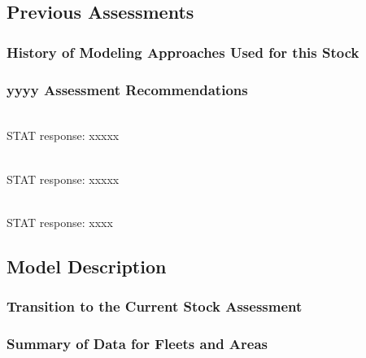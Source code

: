 \documentclass[12pt,]{article}
\begin{document}
\subsection{Previous Assessments}\label{previous-assessments}

\subsubsection{History of Modeling Approaches Used for this
Stock}\label{history-of-modeling-approaches-used-for-this-stock}

\subsubsection{yyyy Assessment
Recommendations}\label{yyyy-assessment-recommendations}

\begin{description}[style=unboxed]

  \item[Recommendation 1: ] \hfill \\

   STAT response: xxxxx

\item[Recommendation 2: ] \hfill \\

  STAT response: xxxxx

\item[Recommendation 3: ] \hfill \\

  STAT response: xxxx

  
\end{description}

\subsection{Model Description}\label{model-description}

\subsubsection{Transition to the Current Stock
Assessment}\label{transition-to-the-current-stock-assessment}

\subsubsection{Summary of Data for Fleets and
Areas}\label{summary-of-data-for-fleets-and-areas}
\end{document}
